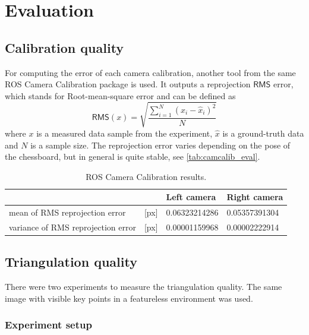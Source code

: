 \chapter{Evaluation}
\label{chapter:evaluation}

\section{Calibration quality}
For computing the error of each camera calibration, another tool from the same ROS Camera Calibration package is used.
It outputs a reprojection $\mathsf{RMS}$ error, which stands for Root-mean-square error and can be defined as
\begin{equation}
    \mathsf{RMS}(x) = \sqrt{\frac{\sum_{i=1}^{N}{(x_i - \hat{x}_i)^2}}{N}}
\end{equation}
where $x$ is a measured data sample from the experiment, $\hat{x}$ is a ground-truth data and $N$ is a sample size.
The reprojection error varies depending on the pose of the chessboard, but in general is quite stable, see \autoref{tab:camcalib_eval}.

\begin{table}[ht]
    \begin{center}
      \begin{tabular}{ ll l l }
      \hline
      && Left camera & Right camera \\ \hline
      mean of RMS reprojection error & [px] & 0.06323214286 & 0.05357391304 \\
      variance of RMS reprojection error & [px] & 0.00001159968 & 0.00002222914 \\
      \end{tabular}
    \end{center}
    \caption{ROS Camera Calibration results.}
    \label{tab:camcalib_eval}
\end{table}

\section{Triangulation quality}
There were two experiments to measure the triangulation quality.
The same image with visible key points in a featureless environment was used.

\subsection{Experiment setup}
\label{sec:eval_setup}

